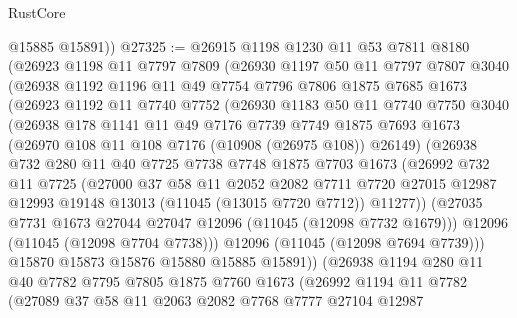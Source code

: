 \begin{lexlean}{RustCore}
\begin{coremodule}
        @15885
        @15891))
@27325 := @26915
    @1198
    @1230
    @11
    @53
    @7811
    @8180
    (@26923
      @1198
      @11
      @7797
      @7809
      (@26930
        @1197
        @50
        @11
        @7797
        @7807
        @3040
        (@26938
          @1192
          @1196
          @11
          @49
          @7754
          @7796
          @7806
          @1875
          @7685
          @1673
          (@26923
            @1192
            @11
            @7740
            @7752
            (@26930
              @1183
              @50
              @11
              @7740
              @7750
              @3040
              (@26938
                @178
                @1141
                @11
                @49
                @7176
                @7739
                @7749
                @1875
                @7693
                @1673
                (@26970 @108 @11 @108 @7176 (@10908 (@26975 @108)) @26149)
                (@26938
                  @732
                  @280
                  @11
                  @40
                  @7725
                  @7738
                  @7748
                  @1875
                  @7703
                  @1673
                  (@26992
                    @732
                    @11
                    @7725
                    (@27000
                      @37
                      @58
                      @11
                      @2052
                      @2082
                      @7711
                      @7720
                      @27015
                      @12987
                      @12993
                      @19148
                      @13013
                      (@11045 (@13015 @7720 @7712))
                      @11277))
                  (@27035 @7731 @1673 @27044 @27047 @12096 (@11045 (@12098 @7732 @1679)))
                  @12096
                  (@11045 (@12098 @7704 @7738)))
                @12096
                (@11045 (@12098 @7694 @7739)))
              @15870
              @15873
              @15876
              @15880
              @15885
              @15891))
          (@26938
            @1194
            @280
            @11
            @40
            @7782
            @7795
            @7805
            @1875
            @7760
            @1673
            (@26992
              @1194
              @11
              @7782
              (@27089
                @37
                @58
                @11
                @2063
                @2082
                @7768
                @7777
                @27104
                @12987

\end{coremodule}
\end{lexlean}
